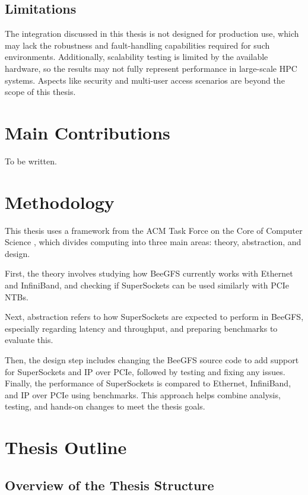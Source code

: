 \subsection{Limitations}

The integration discussed in this thesis is not designed for production use, which may lack the robustness and fault-handling capabilities required for such environments. Additionally, scalability testing is limited by the available hardware, so the results may not fully represent performance in large-scale HPC systems. Aspects like security and multi-user access scenarios are beyond the scope of this thesis.
\section{Main Contributions}
To be written.

\section{Methodology}

This thesis uses a framework from the ACM Task Force on the Core of Computer Science \cite{Denning1989}, which divides computing into three main areas: theory, abstraction, and design.

First, the theory involves studying how BeeGFS currently works with Ethernet and InfiniBand, and checking if SuperSockets can be used similarly with PCIe NTBs.

Next, abstraction refers to how SuperSockets are expected to perform in BeeGFS, especially regarding latency and throughput, and preparing benchmarks to evaluate this.

Then, the design step includes changing the BeeGFS source code to add support for SuperSockets and IP over PCIe, followed by testing and fixing any issues. Finally, the performance of SuperSockets is compared to Ethernet, InfiniBand, and IP over PCIe using benchmarks. This approach helps combine analysis, testing, and hands-on changes to meet the thesis goals.

\section{Thesis Outline}

\subsection{Overview of the Thesis Structure}

